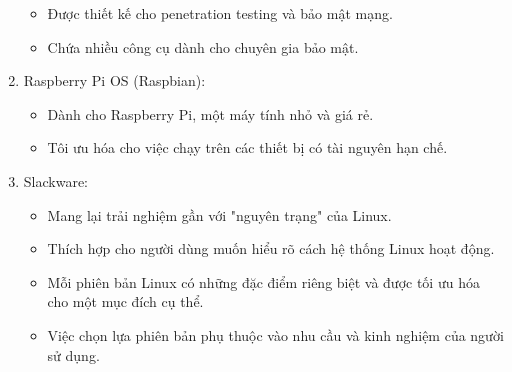 \documentclass[12pt,a4paper]{article}
\begin{document}
\begin{enumerate}
		\begin{itemize}
		\item [] Được thiết kế cho penetration testing và bảo mật mạng.
		\item [] Chứa nhiều công cụ dành cho chuyên gia bảo mật.
		\end{itemize}
	\item Raspberry Pi OS (Raspbian):
		\begin{itemize}
		\item [] Dành cho Raspberry Pi, một máy tính nhỏ và giá rẻ.
		\item [] Tôi ưu hóa cho việc chạy trên các thiết bị có tài nguyên hạn chế.
		\end{itemize}
	\item Slackware:
		\begin{itemize}
		\item [] Mang lại trải nghiệm gần với "nguyên trạng" của Linux.
		\item [] Thích hợp cho người dùng muốn hiểu rõ cách hệ thống Linux hoạt động.
		\item [] Mỗi phiên bản Linux có những đặc điểm riêng biệt và được tối ưu hóa cho một mục đích cụ thể. 
		\item [] Việc chọn lựa phiên bản phụ thuộc vào nhu cầu và kinh nghiệm của người sử dụng.
		\end{itemize}
\end{enumerate}
\end{document}
